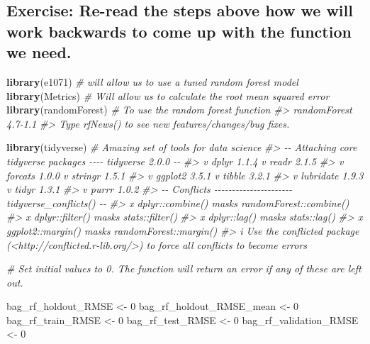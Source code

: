 \documentclass[
]{book}
\newenvironment{Shaded}{\begin{snugshade}}{\end{snugshade}}
\newcommand{\CommentTok}[1]{\textcolor[rgb]{0.56,0.35,0.01}{\textit{#1}}}
\newcommand{\DecValTok}[1]{\textcolor[rgb]{0.00,0.00,0.81}{#1}}
\newcommand{\FunctionTok}[1]{\textcolor[rgb]{0.13,0.29,0.53}{\textbf{#1}}}
\newcommand{\NormalTok}[1]{#1}
\newcommand{\OtherTok}[1]{\textcolor[rgb]{0.56,0.35,0.01}{#1}}
\begin{document}
\subsection{Exercise: Re-read the steps above how we will work backwards to come up with the function we need.}\label{exercise-re-read-the-steps-above-how-we-will-work-backwards-to-come-up-with-the-function-we-need.}

\begin{Shaded}
\begin{Highlighting}[]
\FunctionTok{library}\NormalTok{(e1071) }\CommentTok{\# will allow us to use a tuned random forest model}
\FunctionTok{library}\NormalTok{(Metrics) }\CommentTok{\# Will allow us to calculate the root mean squared error}
\FunctionTok{library}\NormalTok{(randomForest) }\CommentTok{\# To use the random forest function}
\CommentTok{\#\textgreater{} randomForest 4.7{-}1.1}
\CommentTok{\#\textgreater{} Type rfNews() to see new features/changes/bug fixes.}
\end{Highlighting}
\end{Shaded}

\begin{Shaded}
\begin{Highlighting}[]
\FunctionTok{library}\NormalTok{(tidyverse) }\CommentTok{\# Amazing set of tools for data science}
\CommentTok{\#\textgreater{} {-}{-} Attaching core tidyverse packages {-}{-}{-}{-} tidyverse 2.0.0 {-}{-}}
\CommentTok{\#\textgreater{} v dplyr     1.1.4     v readr     2.1.5}
\CommentTok{\#\textgreater{} v forcats   1.0.0     v stringr   1.5.1}
\CommentTok{\#\textgreater{} v ggplot2   3.5.1     v tibble    3.2.1}
\CommentTok{\#\textgreater{} v lubridate 1.9.3     v tidyr     1.3.1}
\CommentTok{\#\textgreater{} v purrr     1.0.2}
\CommentTok{\#\textgreater{} {-}{-} Conflicts {-}{-}{-}{-}{-}{-}{-}{-}{-}{-}{-}{-}{-}{-}{-}{-}{-}{-}{-}{-}{-}{-} tidyverse\_conflicts() {-}{-}}
\CommentTok{\#\textgreater{} x dplyr::combine()  masks randomForest::combine()}
\CommentTok{\#\textgreater{} x dplyr::filter()   masks stats::filter()}
\CommentTok{\#\textgreater{} x dplyr::lag()      masks stats::lag()}
\CommentTok{\#\textgreater{} x ggplot2::margin() masks randomForest::margin()}
\CommentTok{\#\textgreater{} i Use the conflicted package (\textless{}http://conflicted.r{-}lib.org/\textgreater{}) to force all conflicts to become errors}
\end{Highlighting}
\end{Shaded}

\begin{Shaded}
\begin{Highlighting}[]
\CommentTok{\# Set initial values to 0. The function will return an error if any of these are left out.}

\NormalTok{bag\_rf\_holdout\_RMSE }\OtherTok{\textless{}{-}} \DecValTok{0}
\NormalTok{bag\_rf\_holdout\_RMSE\_mean }\OtherTok{\textless{}{-}} \DecValTok{0}
\NormalTok{bag\_rf\_train\_RMSE }\OtherTok{\textless{}{-}} \DecValTok{0}
\NormalTok{bag\_rf\_test\_RMSE }\OtherTok{\textless{}{-}} \DecValTok{0}
\NormalTok{bag\_rf\_validation\_RMSE }\OtherTok{\textless{}{-}} \DecValTok{0}
\end{Highlighting}
\end{Shaded}
\end{document}
